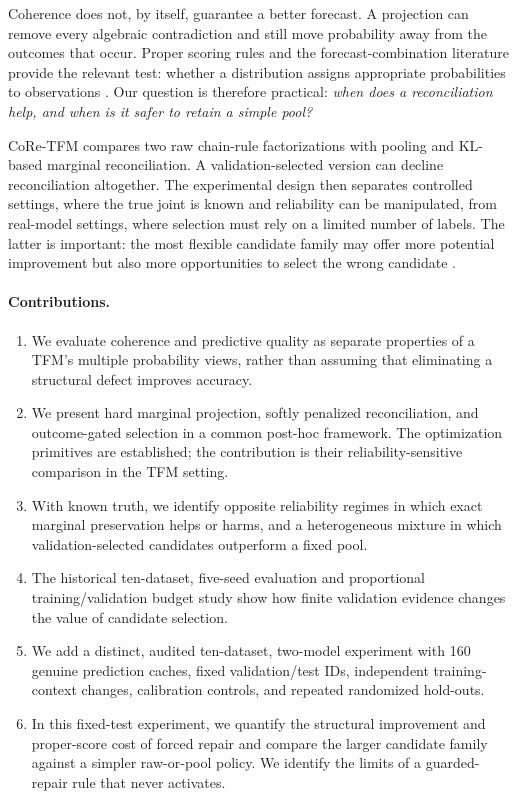 \documentclass[a4paper,fleqn]{cas-sc}
\begin{document}
Coherence does not, by itself, guarantee a better forecast. A projection can remove every algebraic contradiction and still move probability away from the outcomes that occur. Proper scoring rules and the forecast-combination literature provide the relevant test: whether a distribution assigns appropriate probabilities to observations \citep{brier1950,gneiting2007strictly,gneiting2007calibration,genest1986combining,ranjan2010combining,gneiting2013combining}. Our question is therefore practical: \emph{when does a reconciliation help, and when is it safer to retain a simple pool?}

CoRe-TFM compares two raw chain-rule factorizations with pooling and KL-based marginal reconciliation. A validation-selected version can decline reconciliation altogether. The experimental design then separates controlled settings, where the true joint is known and reliability can be manipulated, from real-model settings, where selection must rely on a limited number of labels. The latter is important: the most flexible candidate family may offer more potential improvement but also more opportunities to select the wrong candidate \citep{cawley2010overfitting}.

\paragraph{Contributions.}
\begin{enumerate}
\item We evaluate coherence and predictive quality as separate properties of a TFM's multiple probability views, rather than assuming that eliminating a structural defect improves accuracy.
\item We present hard marginal projection, softly penalized reconciliation, and outcome-gated selection in a common post-hoc framework. The optimization primitives are established; the contribution is their reliability-sensitive comparison in the TFM setting.
\item With known truth, we identify opposite reliability regimes in which exact marginal preservation helps or harms, and a heterogeneous mixture in which validation-selected candidates outperform a fixed pool.
\item The historical ten-dataset, five-seed evaluation and proportional training/validation budget study show how finite validation evidence changes the value of candidate selection.
\item We add a distinct, audited ten-dataset, two-model experiment with 160 genuine prediction caches, fixed validation/test IDs, independent training-context changes, calibration controls, and repeated randomized hold-outs.
\item In this fixed-test experiment, we quantify the structural improvement and proper-score cost of forced repair and compare the larger candidate family against a simpler raw-or-pool policy. We identify the limits of a guarded-repair rule that never activates.
\end{enumerate}
\end{document}
